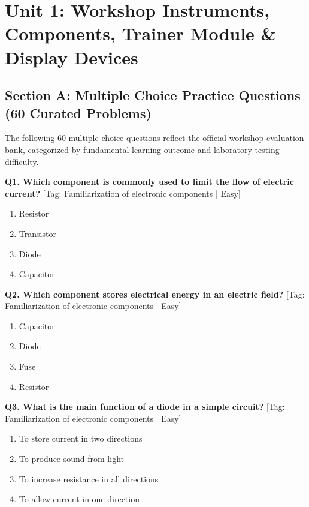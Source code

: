 \chapter{Unit 1: Workshop Instruments, Components, Trainer Module \& Display Devices}

\section{Section A: Multiple Choice Practice Questions (60 Curated Problems)}

\noindent The following 60 multiple-choice questions reflect the official workshop evaluation bank, categorized by fundamental learning outcome and laboratory testing difficulty.\vspace{3mm}

\noindent\textbf{Q1. Which component is commonly used to limit the flow of electric current?} \hfill [Tag: Familiarization of electronic components | Easy]
\begin{enumerate}[label=(\alph*),topsep=2pt,itemsep=1pt,partopsep=0pt,parsep=0pt]
    \item {Resistor}
    \item {Transistor}
    \item {Diode}
    \item {Capacitor}
\end{enumerate}
\vspace{2mm}

\noindent\textbf{Q2. Which component stores electrical energy in an electric field?} \hfill [Tag: Familiarization of electronic components | Easy]
\begin{enumerate}[label=(\alph*),topsep=2pt,itemsep=1pt,partopsep=0pt,parsep=0pt]
    \item {Capacitor}
    \item {Diode}
    \item {Fuse}
    \item {Resistor}
\end{enumerate}
\vspace{2mm}

\noindent\textbf{Q3. What is the main function of a diode in a simple circuit?} \hfill [Tag: Familiarization of electronic components | Easy]
\begin{enumerate}[label=(\alph*),topsep=2pt,itemsep=1pt,partopsep=0pt,parsep=0pt]
    \item {To store current in two directions}
    \item {To produce sound from light}
    \item {To increase resistance in all directions}
    \item {To allow current in one direction}
\end{enumerate}
\vspace{2mm}

